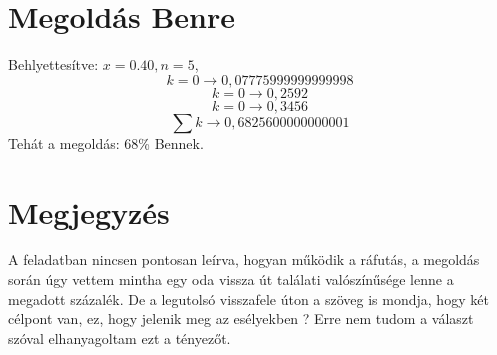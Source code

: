 \documentclass{article}[12pt,a4paper]
\begin{document}
\section{Megoldás Benre}
Behlyettesítve: $x=0.40, n=5$,
$$k=0 \rightarrow 0,07775999999999998$$
$$k=0 \rightarrow 0,2592$$
$$k=0 \rightarrow 0,3456$$
$$\sum k \rightarrow 0,6825600000000001$$
Tehát a megoldás: $68$\% Bennek.

\section{Megjegyzés}
A feladatban nincsen pontosan leírva, hogyan működik a ráfutás, a megoldás során úgy vettem mintha egy oda vissza út találati valószínűsége lenne a megadott százalék. De a legutolsó visszafele úton a szöveg is mondja, hogy két célpont van, ez, hogy jelenik meg az esélyekben ? Erre nem tudom a választ szóval elhanyagoltam ezt a tényezőt.
\end{document}

